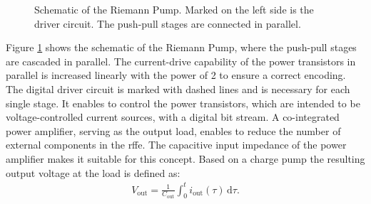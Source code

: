 \documentclass[journal]{IEEEtran}
\begin{document}
%
%
%
%
\begin{figure}[htb]
  \centering
	\begin{scriptsize}
  	\def\svgwidth{\columnwidth}
 	 
  	\caption{Schematic of the Riemann Pump. Marked on the left side is the driver circuit. The push-pull stages are connected in parallel.}
  	\label{fig:schematic_multibit_rp}
	\end{scriptsize}
\end{figure}
%
Figure \ref{fig:schematic_multibit_rp} shows the schematic of the Riemann Pump, where the push-pull stages are cascaded in parallel.
The current-drive capability of the power transistors in parallel is increased linearly with the power of 2 to ensure a correct encoding.
The digital driver circuit is marked with dashed lines and is necessary for each single stage. %
It enables to control the power transistors, which are intended to be voltage-controlled current sources, with a digital bit stream.
A co-integrated power amplifier, serving as the output load, enables to reduce the number of external components in the \gls{rffe}.
The capacitive input impedance of the power amplifier makes it suitable for this concept.
Based on a charge pump the resulting output voltage at the load is defined as:
%
\begin{align}
  V_{\text{out}} =  \frac{1}{C_{\text{out}}} \int_0^t \! i_{\text{out}}(\tau) \, \mathrm{d}\tau.
    \label{eq:output_voltage_integral}
\end{align}
\end{document}
